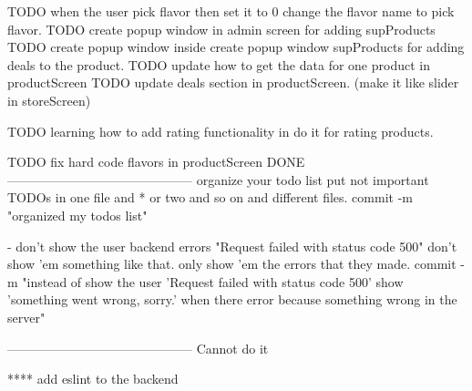 TODO when the user pick flavor then set it to 0 change the flavor name to pick flavor.
TODO create popup window in admin screen for adding supProducts 
TODO create popup window inside create popup window supProducts for adding deals to the product.
TODO update how to get the data for one product in productScreen
TODO update deals section in productScreen. (make it like slider in storeScreen)

TODO learning how to add rating functionality in do it for rating products.

TODO fix hard code flavors in productScreen
DONE
--------------------------------------------
organize your todo list put not important TODOs in one file and * or two and so on and different files.
    commit -m "organized my todos list"

- don't show the user backend errors "Request failed with 
    status code 500" don't show 'em something like that. only 
    show 'em the errors that they made.
    commit -m "instead of show the user 'Request failed with status code 500' show 'something went wrong, sorry.' when there error because something wrong in the server"


--------------------------------------------
Cannot do it

**** add eslint to the backend

